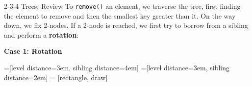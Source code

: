 \documentclass[9pt]{beamer}
\begin{document}
\begin{frame}[fragile]{2-3-4 Trees: Review}
  To {\tt remove()} an element, we traverse the tree, first finding the
  element to remove and then the smallest key greater than it. On the way
  down, we fix 2-nodes. If a 2-node is reached, we first try to borrow from
  a sibling and perform a {\bf rotation}:

  \vspace{1em}
  {\bf Case 1: Rotation}

  \pause
  =[level distance=3em, sibling distance=4em]
  =[level distance=3em, sibling distance=2em]
   = [rectangle, draw]

  \vspace{2em}
\end{frame}
\end{document}
